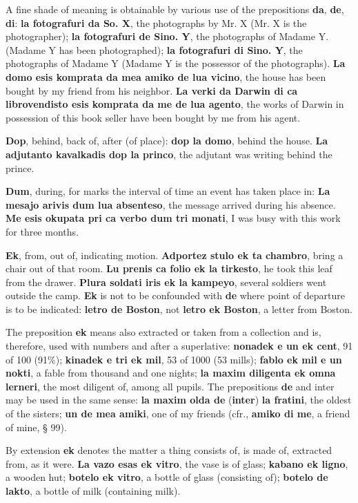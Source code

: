 A fine shade of meaning is obtainable by various use of the prepositions \textbf{da}, \textbf{de}, \textbf{di}: \textbf{la fotografuri da So. X}, the photographs by Mr. X (Mr. X is the photographer); \textbf{la fotografuri de Sino. Y}, the photographs of Madame Y. (Madame Y has been photographed); \textbf{la fotografuri di Sino. Y}, the photographs of Madame Y (Madame Y is the possessor of the photographs). \textbf{La domo esis komprata da mea amiko de lua vicino}, the house has been bought by my friend from his neighbor. \textbf{La verki da Darwin di ca librovendisto esis komprata da me de lua agento}, the works of Darwin in possession of this book seller have been bought by me from his agent.

\textbf{Dop}, behind, back of, after (of place): \textbf{dop la domo}, behind the house. \textbf{La adjutanto kavalkadis dop la princo}, the adjutant was writing behind the prince.

\textbf{Dum}, during, for marks the interval of time an event has taken place in: \textbf{La mesajo arivis dum lua absenteso}, the message arrived during his absence. \textbf{Me esis okupata pri ca verbo dum tri monati}, I was busy with this work for three months.

\textbf{Ek}, from, out of, indicating motion. \textbf{Adportez stulo ek ta chambro}, bring a chair out of that room. \textbf{Lu prenis ca folio ek la tirkesto}, he took this leaf from the drawer. \textbf{Plura soldati iris ek la kampeyo}, several soldiers went outside the camp. \textbf{Ek} is not to be confounded with \textbf{de} where point of departure is to be indicated: \textbf{letro de Boston}, not \textbf{letro ek Boston}, a letter from Boston.

The preposition \textbf{ek} means also extracted or taken from a collection and is, therefore, used with numbers and after a superlative: \textbf{nonadek e un ek cent}, 91 of 100 (91\%); \textbf{kinadek e tri ek mil}, 53 of 1000 (53 mills); \textbf{fablo ek mil e un nokti}, a fable from thousand and one nights; \textbf{la maxim diligenta ek omna lerneri}, the most diligent of, among all pupils. The prepositions \textbf{de} and inter may be used in the same sense: \textbf{la maxim olda de }(\textbf{inter})\textbf{ la fratini}, the oldest of the sisters; \textbf{un de mea amiki}, one of my friends (cfr., \textbf{amiko di me}, a friend of mine, § 99).

By extension \textbf{ek} denotes the matter a thing consists of, is made of, extracted from, as it were. \textbf{La vazo esas ek vitro}, the vase is of glass; \textbf{kabano ek ligno}, a wooden hut; \textbf{botelo ek vitro}, a bottle of glass (consisting of); \textbf{botelo de lakto}, a bottle of milk (containing milk).

